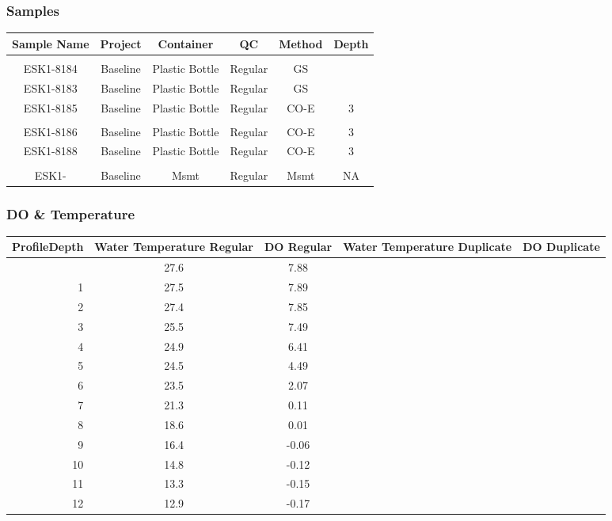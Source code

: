 \documentclass[
  letterpaper,
  DIV=11,
  numbers=noendperiod]{scrartcl}
\begin{document}
\subsubsection{Samples}

\begin{longtable*}{cccccc}
\toprule
Sample Name & Project & Container & QC & Method & Depth \\ 
\midrule\addlinespace[2.5pt]
 \\ 
\midrule\addlinespace[2.5pt]
ESK1-8184 & Baseline & Plastic Bottle & Regular & GS &  \\ 
ESK1-8183 & Baseline & Plastic Bottle & Regular & GS &  \\ 
ESK1-8185 & Baseline & Plastic Bottle & Regular & CO-E & 3 \\ 
\midrule\addlinespace[2.5pt]
 \\ 
\midrule\addlinespace[2.5pt]
ESK1-8186 & Baseline & Plastic Bottle & Regular & CO-E & 3 \\ 
ESK1-8188 & Baseline & Plastic Bottle & Regular & CO-E & 3 \\ 
\midrule\addlinespace[2.5pt]
 \\ 
\midrule\addlinespace[2.5pt]
ESK1- & Baseline & Msmt & Regular & Msmt & NA \\ 
\bottomrule
\end{longtable*}

\subsubsection{DO \& Temperature}

\begin{longtable*}{rcccc}
\toprule
ProfileDepth & Water Temperature Regular & DO Regular & Water Temperature Duplicate & DO Duplicate \\ 
\midrule{} & 27.6 & 7.88 &  &  \\ 
1 & 27.5 & 7.89 &  &  \\ 
2 & 27.4 & 7.85 &  &  \\ 
3 & 25.5 & 7.49 &  &  \\ 
4 & 24.9 & 6.41 &  &  \\ 
5 & 24.5 & 4.49 &  &  \\ 
6 & 23.5 & 2.07 &  &  \\ 
7 & 21.3 & 0.11 &  &  \\ 
8 & 18.6 & 0.01 &  &  \\ 
9 & 16.4 & -0.06 &  &  \\ 
10 & 14.8 & -0.12 &  &  \\ 
11 & 13.3 & -0.15 &  &  \\ 
12 & 12.9 & -0.17 &  &  \\ 
\bottomrule
\end{longtable*}
\end{document}
